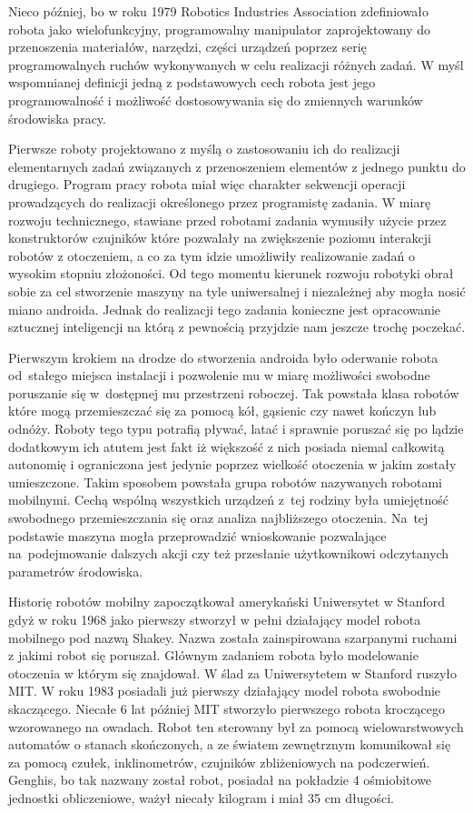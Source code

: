 Nieco później, bo w roku 1979 Robotics Industries Association 
zdefiniowało robota jako wielofunkcyjny, programowalny manipulator
zaprojektowany do przenoszenia materiałów, narzędzi, części urządzeń poprzez
serię programowalnych ruchów wykonywanych w celu realizacji różnych zadań.
W myśl wspomnianej definicji jedną z podstawowych cech robota jest jego
programowalność i możliwość dostosowywania się do zmiennych warunków środowiska
pracy. 

Pierwsze roboty projektowano z myślą o zastosowaniu ich do realizacji
elementarnych zadań związanych z przenoszeniem elementów z jednego punktu do
drugiego. Program pracy robota miał więc charakter sekwencji operacji
prowadzących do realizacji określonego przez programistę zadania. W miarę
rozwoju technicznego, stawiane przed robotami zadania wymusiły użycie przez
konstruktorów czujników które pozwalały na zwiększenie poziomu interakcji
robotów z otoczeniem, a co za tym idzie umożliwiły realizowanie zadań o wysokim
stopniu złożoności. Od tego momentu kierunek rozwoju robotyki obrał
sobie za cel stworzenie maszyny na tyle uniwersalnej i niezależnej aby mogła
nosić miano androida. Jednak do realizacji tego zadania konieczne jest
opracowanie sztucznej inteligencji na którą z pewnością przyjdzie nam jeszcze
trochę poczekać. 

Pierwszym krokiem na drodze do stworzenia androida było oderwanie robota
od~stałego miejsca instalacji i pozwolenie mu w miarę możliwości swobodne
poruszanie się w~dostępnej mu przestrzeni roboczej. Tak powstała klasa robotów
które mogą przemieszczać się za pomocą kół, gąsienic czy nawet kończyn lub
odnóży. Roboty tego typu potrafią pływać, latać i sprawnie poruszać się po lądzie
dodatkowym ich atutem jest fakt iż większość z nich posiada niemal całkowitą
autonomię i ograniczona jest jedynie poprzez wielkość otoczenia w jakim zostały
umieszczone. Takim sposobem powstała grupa robotów nazywanych robotami mobilnymi.
Cechą wspólną wszystkich urządzeń z~tej rodziny była umiejętność swobodnego
przemieszczania się oraz analiza najbliższego otoczenia. Na~tej podstawie maszyna
mogła przeprowadzić wnioskowanie pozwalające na~podejmowanie dalszych akcji czy
też przesłanie użytkownikowi odczytanych parametrów środowiska.

Historię robotów mobilny zapoczątkował amerykański Uniwersytet w Stanford gdyż
w roku 1968 jako pierwszy stworzył w pełni działający model robota mobilnego pod
nazwą Shakey. Nazwa została zainspirowana szarpanymi ruchami z jakimi robot się
poruszał. Głównym zadaniem robota było modelowanie otoczenia w którym się
znajdował. W ślad za Uniwersytetem w Stanford ruszyło MIT. W roku 1983 posiadali
już pierwszy działający model robota swobodnie skaczącego. Niecałe 6
lat później MIT stworzyło pierwszego robota kroczącego wzorowanego na owadach.
Robot ten sterowany był za pomocą wielowarstwowych automatów o stanach
skończonych, a ze światem zewnętrznym komunikował się za pomocą czułek,
inklinometrów, czujników zbliżeniowych na podczerwień. Genghis, bo tak
nazwany został robot, posiadał na pokładzie 4 ośmiobitowe jednostki obliczeniowe, ważył
niecały kilogram i miał 35 cm długości.

